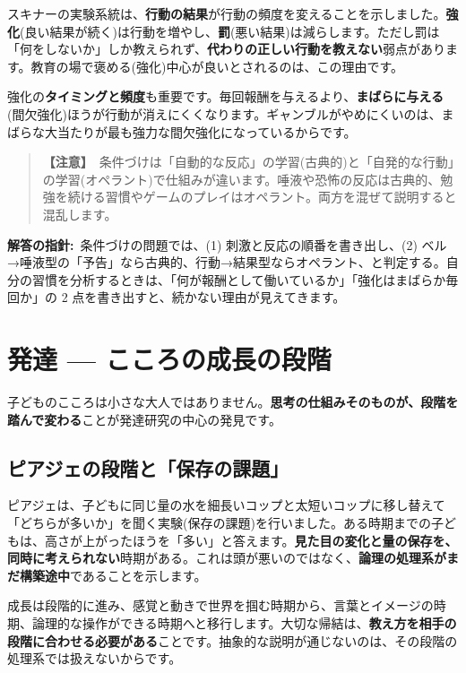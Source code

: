 \documentclass{article}
\begin{document}
スキナーの実験系統は、\textbf{行動の結果}が行動の頻度を変えることを示しました。\textbf{強化}(良い結果が続く)は行動を増やし、\textbf{罰}(悪い結果)は減らします。ただし罰は「何をしないか」しか教えられず、\textbf{代わりの正しい行動を教えない}弱点があります。教育の場で褒める(強化)中心が良いとされるのは、この理由です。

強化の\textbf{タイミングと頻度}も重要です。毎回報酬を与えるより、\textbf{まばらに与える}(間欠強化)ほうが行動が消えにくくなります。ギャンブルがやめにくいのは、まばらな大当たりが最も強力な間欠強化になっているからです。

\begin{quote}
\textbf{【注意】}\ 条件づけは「自動的な反応」の学習(古典的)と「自発的な行動」の学習(オペラント)で仕組みが違います。唾液や恐怖の反応は古典的、勉強を続ける習慣やゲームのプレイはオペラント。両方を混ぜて説明すると混乱します。
\end{quote}

\textbf{解答の指針:}\ 条件づけの問題では、(1) 刺激と反応の順番を書き出し、(2) ベル→唾液型の「予告」なら古典的、行動→結果型ならオペラント、と判定する。自分の習慣を分析するときは、「何が報酬として働いているか」「強化はまばらか毎回か」の 2 点を書き出すと、続かない理由が見えてきます。

\section{発達 — こころの成長の段階}

子どものこころは小さな大人ではありません。\textbf{思考の仕組みそのものが、段階を踏んで変わる}ことが発達研究の中心の発見です。

\subsection{ピアジェの段階と「保存の課題」}

ピアジェは、子どもに同じ量の水を細長いコップと太短いコップに移し替えて「どちらが多いか」を聞く実験(保存の課題)を行いました。ある時期までの子どもは、高さが上がったほうを「多い」と答えます。\textbf{見た目の変化と量の保存を、同時に考えられない}時期がある。これは頭が悪いのではなく、\textbf{論理の処理系がまだ構築途中}であることを示します。

成長は段階的に進み、感覚と動きで世界を掴む時期から、言葉とイメージの時期、論理的な操作ができる時期へと移行します。大切な帰結は、\textbf{教え方を相手の段階に合わせる必要がある}ことです。抽象的な説明が通じないのは、その段階の処理系では扱えないからです。
\end{document}
